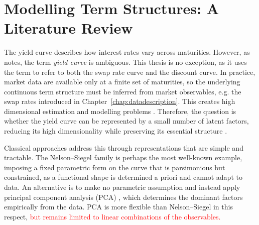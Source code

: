 \chapter{Modelling Term Structures: A Literature Review}
\label{ch:model-background}

The yield curve describes how interest rates vary across maturities. However, as \citet{Filipovic2009} notes, the term \textit{yield curve} is ambiguous. This thesis is no exception, as it uses the term to refer to both the swap rate curve and the discount curve. In practice, market data are available only at a finite set of maturities, so the underlying continuous term structure must be inferred from market observables, e.g. the swap rates introduced in Chapter~\ref{chap:datadescription}. This creates high dimensional estimation and modelling problems \citep{Filipovic2009}. Therefore, the question is whether the yield curve can be represented by a small number of latent factors, reducing its high dimensionality while preserving its essential structure \citep{Skovmand2025tsm}.




Classical approaches address this through representations that are simple and tractable. The Nelson--Siegel family \citep{NelsonSiegel1987} is perhaps the most well-known example, imposing a fixed parametric form on the curve that is parsimonious but constrained, as a functional shape is determined a priori and cannot adapt to data. An alternative is to make no parametric assumption and instead apply principal component analysis (PCA) \citep{Skovmand2025tsm}, which determines the dominant factors empirically from the data. PCA is more flexible than Nelson--Siegel in this respect, \textcolor{red}{but remains limited to linear combinations of the observables. }

